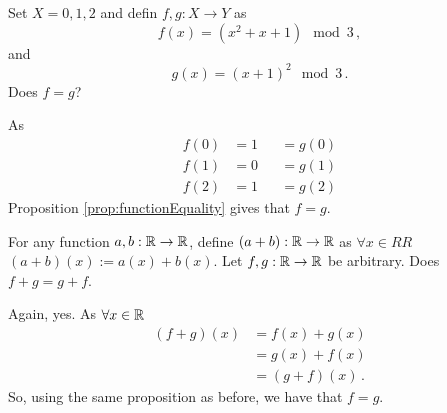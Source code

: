 \guard




\begin{exmp}
\label{exmp:functionEquality}
  Set $X = {0,1,2}$ and defin $f,g:X\to Y$ as \[ f(x) = (x^2+x+1)\mod 3\,,\] and \[ g(x) = (x+1)^2 \mod 3\,.\]
  Does $f=g$?

  As
  \begin{align*}
    f(0)  &= 1  &&= g(0) \\
    f(1)  &= 0  &&= g(1) \\
    f(2)  &= 1  &&= g(2)
  \end{align*}
  Proposition \ref{prop:functionEquality} gives that $f=g$.


  For any function $a,b:\mathbb{R}\to\mathbb{R}$, define $(a+b):\mathbb{R}\to\mathbb{R}$ as $\forall x\in RR$ $(a+b)(x) := a(x) + b(x)$.
  Let $f,g:\mathbb{R}\to\mathbb{R}$ be arbitrary.
  Does $f+g = g+f$.

  Again, yes.
  As $\forall x\in \mathbb{R}$
  \begin{align*}
    (f+g)(x)  &= f(x) + g(x) \\
              &= g(x) + f(x) \\
              &= (g+f)(x)\,.
  \end{align*}
  So, using the same proposition as before, we have that $f=g$.
\end{exmp}
